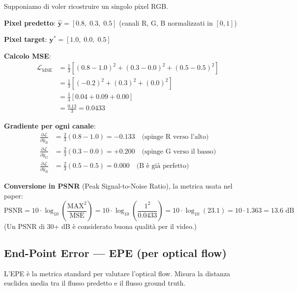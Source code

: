 \documentclass[12pt,a4paper]{article}
\begin{document}
\begin{examplebox}
Supponiamo di voler ricostruire un singolo pixel RGB.

\textbf{Pixel predetto}: $\hat{\mathbf{y}} = [0.8, \; 0.3, \; 0.5]$ (canali R, G, B normalizzati in $[0, 1]$)

\textbf{Pixel target}: $\mathbf{y}^* = [1.0, \; 0.0, \; 0.5]$

\textbf{Calcolo MSE}:
\begin{align*}
\mathcal{L}_{\text{MSE}} &= \frac{1}{3}\left[(0.8 - 1.0)^2 + (0.3 - 0.0)^2 + (0.5 - 0.5)^2\right] \\
&= \frac{1}{3}\left[(-0.2)^2 + (0.3)^2 + (0.0)^2\right] \\
&= \frac{1}{3}\left[0.04 + 0.09 + 0.00\right] \\
&= \frac{0.13}{3} = 0.0433
\end{align*}

\textbf{Gradiente per ogni canale}:
\begin{align*}
\frac{\partial \mathcal{L}}{\partial \hat{y}_R} &= \frac{2}{3}(0.8 - 1.0) = -0.133 \quad \text{(spinge R verso l'alto)} \\
\frac{\partial \mathcal{L}}{\partial \hat{y}_G} &= \frac{2}{3}(0.3 - 0.0) = +0.200 \quad \text{(spinge G verso il basso)} \\
\frac{\partial \mathcal{L}}{\partial \hat{y}_B} &= \frac{2}{3}(0.5 - 0.5) = 0.000 \quad \text{(B \`e gi\`a perfetto)}
\end{align*}

\textbf{Conversione in PSNR} (Peak Signal-to-Noise Ratio), la metrica usata nel paper:
\[
\text{PSNR} = 10 \cdot \log_{10}\left(\frac{\text{MAX}^2}{\text{MSE}}\right) = 10 \cdot \log_{10}\left(\frac{1^2}{0.0433}\right) = 10 \cdot \log_{10}(23.1) = 10 \cdot 1.363 = 13.6 \text{ dB}
\]
(Un PSNR di 30+ dB \`e considerato buona qualit\`a per il video.)
\end{examplebox}

\subsection{End-Point Error --- EPE (per optical flow)}

L'EPE \`e la metrica standard per valutare l'optical flow. Misura la distanza euclidea media tra il flusso predetto e il flusso ground truth.
\end{document}
